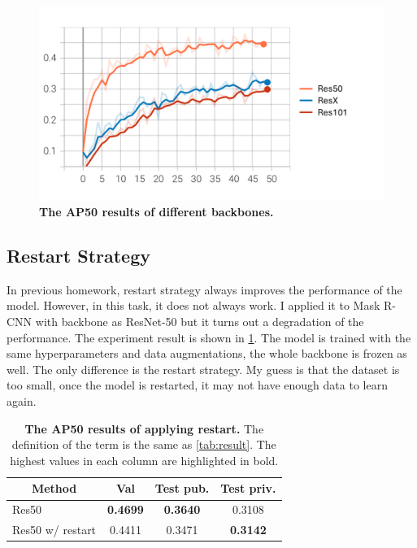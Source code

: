 \documentclass[10pt,twocolumn,letterpaper]{article}
\begin{document}
\begin{figure}[h]
  \centering
  \includegraphics[width=0.95\linewidth]{assets/exp_backbone_ap50.png}
  \caption{\textbf{The AP50 results of different backbones.}}
  \label{fig:exp-backbone}
\end{figure}

\subsection*{Restart Strategy}

In previous homework, restart strategy always improves the performance
of the model. However, in this task, it does not always work. I applied it
to Mask R-CNN with backbone as ResNet-50 but it turns out a degradation
of the performance. The experiment result is shown in \cref{tab:restart}.
The model is trained with the same hyperparameters and data augmentations,
the whole backbone is frozen as well. The only difference is the restart
strategy. My guess is that the dataset is too small, once the model is
restarted, it may not have enough data to learn again.

\begin{table}[h]
  \centering
  \begin{tabular}{lccc}
    \toprule
    \multicolumn{1}{c}{\textbf{Method}}   & \textbf{Val}    & \textbf{Test pub.} & \textbf{Test priv.} \\
    \midrule
    Res50                                 & \textbf{0.4699} & \textbf{0.3640}    & 0.3108              \\
    Res50 w/ restart                      & 0.4411          & 0.3471             & \textbf{0.3142}     \\
    \bottomrule
  \end{tabular}
  \caption{\textbf{The AP50 results of applying restart.} The definition of the
    term is the same as \cref{tab:result}. The highest values in each
    column are highlighted in bold.
  }
  \label{tab:restart}
\end{table}
\end{document}
